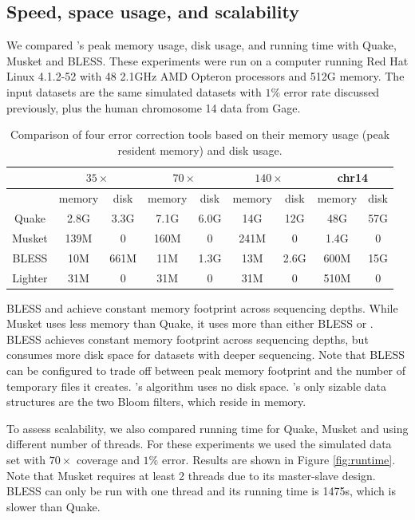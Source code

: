 \documentclass{bmcart}
\begin{document}
\subsection*{Speed, space usage, and scalability}

We compared \tool's peak memory usage, disk usage, and running time with Quake, Musket and BLESS.  These experiments were run on a computer running Red Hat Linux 4.1.2-52 with 48 2.1GHz AMD Opteron processors and 512G memory.
The input datasets are the same simulated \ecoli datasets with $1\%$ error rate discussed previously, plus the human chromosome 14 data from Gage.

\begin{table}
\centering
\begin{tabular}{|c|c|c||c|c||c|c||c|c|} \hline
		& \multicolumn{2}{|c||}{$35\times$} & \multicolumn{2}{|c||}{$70\times$}  & \multicolumn{2}{|c||}{$140\times$} & \multicolumn{2}{|c|}{chr14}  \\ \hline
		& memory & disk & memory & disk & memory & disk & memory & disk \\ \hline
Quake   & 2.8G	& 3.3G & 7.1G & 6.0G & 14G & 12G & 48G & 57G \\ \hline		
Musket	& 139M	& 0 & 160M & 0 & 241M & 0 & 1.4G & 0 \\ \hline
BLESS	& 10M	& 661M & 11M & 1.3G & 13M & 2.6G & 600M & 15G \\ \hline
Lighter	& 31M	& 0 & 31M & 0 & 31M & 0 & 510M & 0 \\ \hline
\end{tabular}
\caption{Comparison of four error correction tools based on their memory usage (peak resident memory) and disk usage.\label{table:memory_usage}}
\end{table}

BLESS and \tool achieve constant memory footprint across sequencing depths.  While Musket uses less memory than Quake, it uses more than either BLESS or \tool.  BLESS achieves constant memory footprint across sequencing depths, but consumes more disk space for datasets with deeper sequencing.  Note that BLESS can be configured to trade off between peak memory footprint and the number of temporary files it creates.  \tool's algorithm uses no disk space.  \tool's only sizable data structures are the two Bloom filters, which reside in memory.

To assess scalability, we also compared running time for Quake, Musket and \tool using different number of threads.  For these experiments we used the simulated \ecoli data set with $70\times$ coverage and $1\%$ error.  Results are shown in Figure \ref{fig:runtime}.  Note that Musket requires at least 2 threads due to its master-slave design.  BLESS can only be run with one thread and its running time is 1475s, which is slower than Quake.
\end{document}
